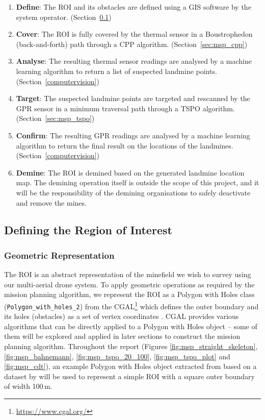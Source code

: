 \begin{enumerate}
    \item \textbf{Define}: The \gls{ROI} and its obstacles are defined using a \gls{GIS} software by the system operator. (Section~\ref{sec:msp_define})
    \item \textbf{Cover}: The \gls{ROI} is fully covered by the thermal sensor in a Boustrophedon (back-and-forth) path through a \gls{CPP} algorithm. (Section~\ref{sec:msp_cpp})
    \item \textbf{Analyse}: The resulting thermal sensor readings are analysed by a machine learning algorithm to return a list of suspected landmine points. (Section~\ref{computervision}) 
    \item \textbf{Target}: The suspected landmine points are targeted and rescanned by the \gls{GPR} sensor in a minimum traversal path through a \gls{TSPO} algorithm. (Section~\ref{sec:msp_tspo}) 
    \item \textbf{Confirm}: The resulting \gls{GPR} readings are analysed by a machine learning algorithm to return the final result on the locations of the landmines. (Section~\ref{computervision})
    \item \textbf{Demine}: The \gls{ROI} is demined based on the generated landmine location map. The demining operation itself is outside the scope of this project, and it will be the responsibility of the demining organisations to safely deactivate and remove the mines.
\end{enumerate}


\subsection{Defining the Region of Interest}
\label{sec:msp_define}

\subsubsection{Geometric Representation}

The \gls{ROI} is an abstract representation of the minefield we wish to survey using our multi-aerial drone system. To apply geometric operations as required by the mission planning algorithm, we represent the \gls{ROI} as a Polygon with Holes class (\texttt{Polygon\_with\_holes\_2}) from the \gls{CGAL}\footnote{\url{https://www.cgal.org/}} which defines the outer boundary and its holes (obstacles) as a set of vertex coordinates \cite{cgal2024pwh}. \gls{CGAL} provides various algorithms that can be directly applied to a Polygon with Holes object -- some of them will be explored and applied in later sections to construct the mission planning algorithm. Throughout the report (Figures \ref{fig:msp_straight_skeleton}, \ref{fig:msp_bahnemann}, \ref{fig:msp_tspo_20_100}, \ref{fig:msp_tspo_plot} and \ref{fig:msp_cdt}), an example Polygon with Holes object extracted from \cite{bahnemann2021cpp} based on a dataset by \cite{sun2014dataset} will be used to represent a simple \gls{ROI} with a square outer boundary of width 100\,m. 

